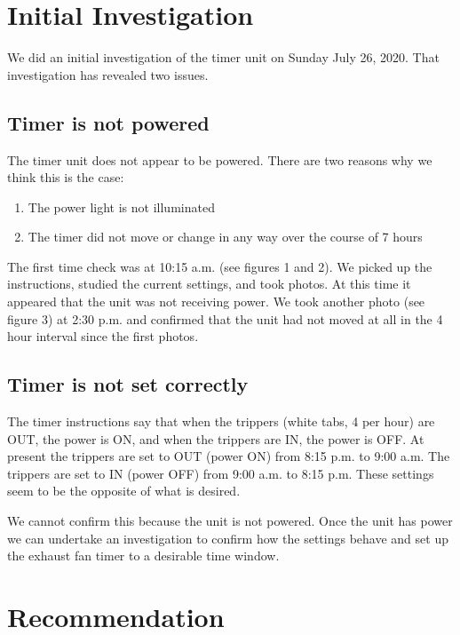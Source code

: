\documentclass[letterpaper,12pt]{texMemo}
\begin{document}
\section{Initial Investigation}

We did an initial investigation of the timer unit on Sunday July 26, 2020.
That investigation has revealed two issues.

\subsection{Timer is not powered}

The timer unit does not appear to be powered. There are two reasons
why we think this is the case:

\begin{enumerate}
\item The power light is not illuminated
\item The timer did not move or change in any way over the course of 7 hours
\end{enumerate}

The first time check was at 10:15 a.m. (see figures 1 and 2). We picked up the
instructions, studied the current settings, and took photos. At this time it
appeared that the unit was not receiving power. We took another photo
(see figure 3) at 2:30 p.m. and confirmed that the unit had not moved at
all in the 4 hour interval since the first photos.

\subsection{Timer is not set correctly}

The timer instructions say that when the trippers (white tabs, 4 per hour)
are OUT, the power is ON, and
when the trippers are IN, the power is OFF. At present the trippers are set
to OUT (power ON) from 8:15 p.m. to 9:00 a.m. The
trippers are set to IN (power OFF) from 9:00 a.m. to 8:15 p.m.
These settings seem to be the opposite of what is desired.

We cannot confirm this because the unit is not powered. Once the unit has
power we can undertake an investigation to confirm how the settings behave
and set up the exhaust fan timer to a desirable time window.

\section{Recommendation}
\end{document}
